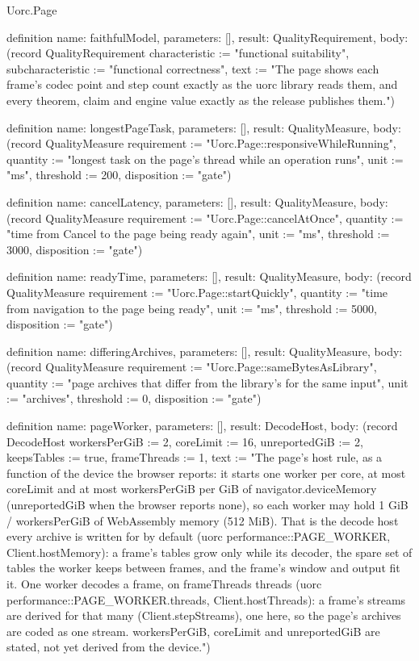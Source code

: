 \begin{lexlean}{Uorc.Page}
\begin{semanticmodule}
definition{
  name: faithfulModel,
  parameters: [],
  result: QualityRequirement,
  body: (record QualityRequirement {characteristic := "functional suitability", subcharacteristic := "functional correctness", text := "The page shows each frame's codec point and step count exactly as the uorc library reads them, and every theorem, claim and engine value exactly as the release publishes them."})
}

definition{
  name: longestPageTask,
  parameters: [],
  result: QualityMeasure,
  body: (record QualityMeasure {requirement := "Uorc.Page::responsiveWhileRunning", quantity := "longest task on the page's thread while an operation runs", unit := "ms", threshold := 200, disposition := "gate"})
}

definition{
  name: cancelLatency,
  parameters: [],
  result: QualityMeasure,
  body: (record QualityMeasure {requirement := "Uorc.Page::cancelAtOnce", quantity := "time from Cancel to the page being ready again", unit := "ms", threshold := 3000, disposition := "gate"})
}

definition{
  name: readyTime,
  parameters: [],
  result: QualityMeasure,
  body: (record QualityMeasure {requirement := "Uorc.Page::startQuickly", quantity := "time from navigation to the page being ready", unit := "ms", threshold := 5000, disposition := "gate"})
}

definition{
  name: differingArchives,
  parameters: [],
  result: QualityMeasure,
  body: (record QualityMeasure {requirement := "Uorc.Page::sameBytesAsLibrary", quantity := "page archives that differ from the library's for the same input", unit := "archives", threshold := 0, disposition := "gate"})
}

definition{
  name: pageWorker,
  parameters: [],
  result: DecodeHost,
  body: (record DecodeHost {workersPerGiB := 2, coreLimit := 16, unreportedGiB := 2, keepsTables := true, frameThreads := 1, text := "The page's host rule, as a function of the device the browser reports: it starts one worker per core, at most coreLimit and at most workersPerGiB per GiB of navigator.deviceMemory (unreportedGiB when the browser reports none), so each worker may hold 1 GiB / workersPerGiB of WebAssembly memory (512 MiB). That is the decode host every archive is written for by default (uorc performance::PAGE_WORKER, Client.hostMemory): a frame's tables grow only while its decoder, the spare set of tables the worker keeps between frames, and the frame's window and output fit it. One worker decodes a frame, on frameThreads threads (uorc performance::PAGE_WORKER.threads, Client.hostThreads): a frame's streams are derived for that many (Client.stepStreams), one here, so the page's archives are coded as one stream. workersPerGiB, coreLimit and unreportedGiB are stated, not yet derived from the device."})
}


\end{semanticmodule}
\end{lexlean}
